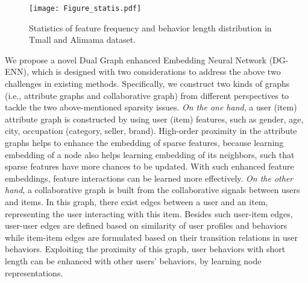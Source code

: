 \begin{figure}
	\centering
	\setlength{\belowcaptionskip}{-0.3cm}
	\setlength{\abovecaptionskip}{0cm}
	\texttt{[image: Figure\_statis.pdf]}
	\caption{Statistics of feature frequency and behavior length distribution in Tmall and Alimama dataset.
	}
	\label{fig:statistics}
\end{figure}

We propose a novel 
Dual Graph enhanced Embedding Neural Network (DG-ENN), which is designed with two considerations to address the above two challenges in existing methods.
Specifically, we construct two kinds of graphs (i.e., attribute graphs and collaborative graph) from different perspectives to tackle the two above-mentioned sparsity issues. \emph{On the one hand}, a user (item) attribute graph is constructed by using user (item) features, such as gender, age, city, occupation (category, seller, brand). High-order proximity in the attribute graphs helps to enhance the embedding of sparse features, because learning embedding of a node also helps learning embedding of its neighbors, such that sparse features have more chances to be updated. With such enhanced feature embeddings, feature interactions can be learned more effectively. \emph{On the other hand}, a collaborative graph is built from the collaborative signals between users and items. In this graph, there exist edges between a user and an item, representing the user interacting with this item. Besides such user-item edges, user-user edges are defined based on similarity of user profiles and behaviors while item-item edges are formulated based on their transition relations in user behaviors. Exploiting the proximity of this graph, user behaviors with short length can be enhanced with other users' behaviors, by learning node representations.

